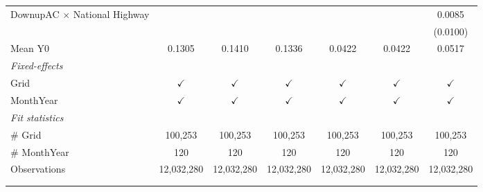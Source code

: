 \begin{table}[htbp]
\begin{tabular}{lcccccc}
      DownupAC $\times$ National Highway                         &               &               &               &               &               & 0.0085\\   
                                                                 &               &               &               &               &               & (0.0100)\\   
      \hline Mean Y0                                             & 0.1305        & 0.1410        & 0.1336        & 0.0422        & 0.0422        & 0.0517\\  
      \midrule
      \emph{Fixed-effects}\\
      Grid                                                       & $\checkmark$  & $\checkmark$  & $\checkmark$  & $\checkmark$  & $\checkmark$  & $\checkmark$\\   
      MonthYear                                                  & $\checkmark$  & $\checkmark$  & $\checkmark$  & $\checkmark$  & $\checkmark$  & $\checkmark$\\   
      \midrule
      \emph{Fit statistics}\\
      \# Grid                                                    & 100,253       & 100,253       & 100,253       & 100,253       & 100,253       & 100,253\\  
      \# MonthYear                                               & 120           & 120           & 120           & 120           & 120           & 120\\  
      Observations                                               & 12,032,280    & 12,032,280    & 12,032,280    & 12,032,280    & 12,032,280    & 12,032,280\\  
      \midrule \midrule
                                                                 &               &               &               &               &               &  \tabularnewline 
      \\
   \end{tabular}
\end{table}


